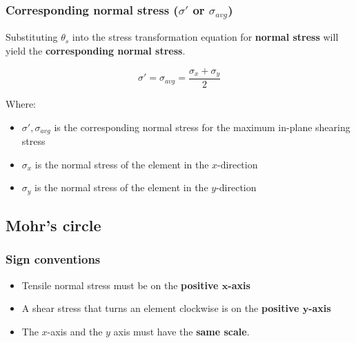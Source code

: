\documentclass[11pt]{article}
\begin{document}
\subsubsection{Corresponding normal stress (\(\sigma'\) or \(\sigma_{avg}\))}
\label{sec:org07c78a9}
Substituting \(\theta_s\) into the stress transformation equation for \textbf{normal stress} will yield the \textbf{corresponding normal stress}.

\[\sigma' = \sigma_{avg} = \frac{\sigma_x + \sigma_y}{2}\]

Where:
\begin{itemize}
\item \(\sigma', \sigma_{avg}\) is the corresponding normal stress for the maximum in-plane shearing stress
\item \(\sigma_x\) is the normal stress of the element in the \(x\)-direction
\item \(\sigma_y\) is the normal stress of the element in the \(y\)-direction
\end{itemize}

\subsection{Mohr's circle}
\label{sec:org5a91906}

\subsubsection{Sign conventions}
\label{sec:org2e970ca}
\begin{itemize}
\item Tensile normal stress must be on the \textbf{positive \(\boldsymbol{x}\)-axis}
\item A shear stress that turns an element clockwise is on the \textbf{positive \(\boldsymbol{y}\)-axis}
\item The \(x\)-axis and the \(y\) axis must have the \textbf{same scale}.
\end{itemize}
\end{document}
